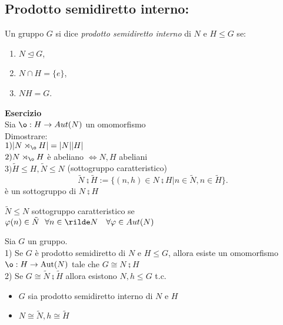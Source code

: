 \documentclass[12px]{article}
\begin{document}
\subsection{Prodotto semidiretto interno:}
Un gruppo \( G \) si dice \textit{prodotto semidiretto interno} di \( N \) e \( H \leq G \) se:
\begin{enumerate}
    \item \( N \trianglelefteq G \),
    \item \( N \cap H = \{ e \} \),
    \item \( N H = G \).
\end{enumerate}
\textbf{Esercizio}\\
Sia $\o : H \rightarrow Aut(N)$ un omomorfismo\\
Dimostrare:\\
$1) |N\rtimes_{\o} H | = |N||H|$\\
$2) N\rtimes_{\o} H$ è abeliano $ \Leftrightarrow N,H$ abeliani \\
$3) \tilde H \leq H, \tilde N \leq N$ (sottogruppo caratteristico)\\
 \[
\tilde N \semi \tilde H := \{ (n,h)\in N\semi H | 
	n\in \tilde N,
	n\in \tilde H
 \}
.\] 
è un sottogruppo di $N \semi H$\\
\begin{defi}
	$\tilde N\leq N$ sottogruppo caratteristico se \\$ \varphi(n)\in \tilde N\ \ \forall n\in \rilde N\ \ \ \forall \varphi\in Aut(N)$
\end{defi}
\begin{teo}
Sia \( G \) un gruppo. \\1) Se \( G \) è prodotto semidiretto di \( N \) e \( H \leq G \), allora esiste un omomorfismo \( \o : H \to \text{Aut}(N) \) tale che $G\cong N\semi H$\\
2) Se  $G\cong \tilde N\semi \tilde H$ allora esistono $N,h\leq G$ t.c.
\begin{itemize}
	\setlength\itemsep{-1em}
	\item $G$ sia prodotto semidiretto interno di $N$ e $H$ \\
	\item $N\cong \tilde N, h\cong \tilde H$
\end{itemize}
\end{teo}
\end{document}
